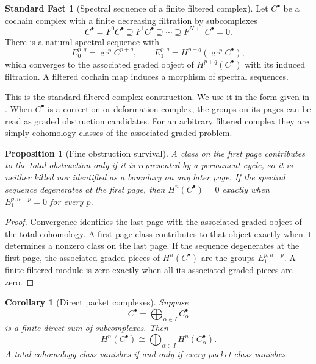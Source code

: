 \documentclass{aomart}
\newtheorem{proposition}[proposition]{Proposition}
\newtheorem{corollary}[corollary]{Corollary}
\theoremstyle{definition}
\newtheorem{standardfact}[standardfact]{Standard Fact}
\theoremstyle{remark}
\newcommand{\gr}{\operatorname{gr}}
\begin{document}
\begin{standardfact}[Spectral sequence of a finite filtered complex]\label{fact:filtered_spectral_sequence}
Let $C^\bullet$ be a cochain complex with a finite decreasing filtration by subcomplexes
\[
C^\bullet=F^0C^\bullet\supseteq F^1C^\bullet\supseteq\cdots\supseteq F^{N+1}C^\bullet=0.
\]
There is a natural spectral sequence with
\[
E_0^{p,q}=\gr^pC^{p+q},
\qquad
E_1^{p,q}=H^{p+q}(\gr^pC^\bullet),
\]
which converges to the associated graded object of $H^{p+q}(C^\bullet)$ with its induced filtration.  A filtered cochain map induces a morphism of spectral sequences.
\end{standardfact}

This is the standard filtered complex construction.  We use it in the form given in \cite{Weibel1994,McCleary2001}.  When $C^\bullet$ is a correction or deformation complex, the groups on its pages can be read as graded obstruction candidates.  For an arbitrary filtered complex they are simply cohomology classes of the associated graded problem.

\begin{proposition}[Fine obstruction survival]\label{prop:fine_obstruction_survival}
A class on the first page contributes to the total obstruction only if it is represented by a permanent cycle, so it is neither killed nor identified as a boundary on any later page.  If the spectral sequence degenerates at the first page, then $H^n(C^\bullet)=0$ exactly when $E_1^{p,n-p}=0$ for every $p$.
\end{proposition}

\begin{proof}
Convergence identifies the last page with the associated graded object of the total cohomology.  A first page class contributes to that object exactly when it determines a nonzero class on the last page.  If the sequence degenerates at the first page, the associated graded pieces of $H^n(C^\bullet)$ are the groups $E_1^{p,n-p}$.  A finite filtered module is zero exactly when all its associated graded pieces are zero.
\end{proof}

\begin{corollary}[Direct packet complexes]\label{cor:direct_packet_no_cancellation}
Suppose
\[
C^\bullet=\bigoplus_{\alpha\in I}C_\alpha^\bullet
\]
is a finite direct sum of subcomplexes.  Then
\[
H^n(C^\bullet)
\cong
\bigoplus_{\alpha\in I}H^n(C_\alpha^\bullet).
\]
A total cohomology class vanishes if and only if every packet class vanishes.
\end{corollary}
\end{document}
